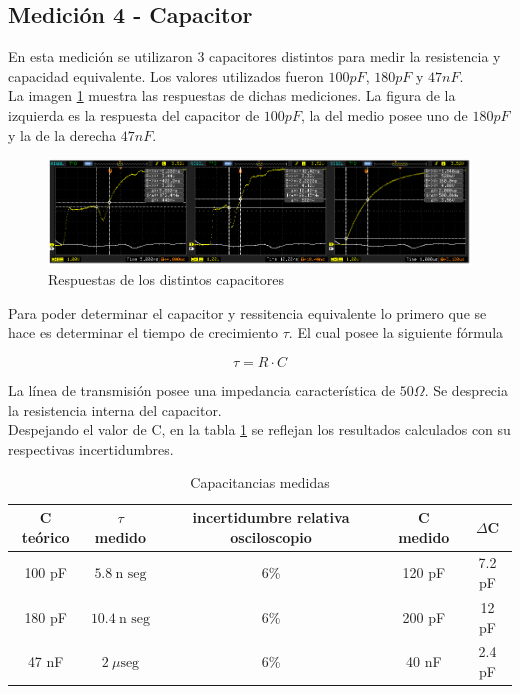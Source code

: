 \documentclass[a4paper,10pt]{article}
\begin{document}
	\subsection{Medición 4 - Capacitor}
	\indent En esta medición se utilizaron 3 capacitores distintos para medir
	la resistencia y capacidad equivalente. Los valores utilizados fueron 
	$100pF$, $180pF$ y $47nF$. \\
	\indent La imagen \ref{img010} muestra las respuestas de dichas 
	mediciones. La figura de la izquierda es la respuesta del capacitor de 
	$100pF$, la del medio posee uno de $180pF$ y la de la derecha $47nF$. \\
	
		\begin{figure}[!htb]
			\centering
			\includegraphics[width=12cm]
			{Imagenes/CurvasCapacitor.png}
			\caption{Respuestas de los distintos capacitores}
			\label{img010} 
		\end{figure}

	\indent Para poder determinar el capacitor y ressitencia equivalente lo 
	primero que se hace es determinar el tiempo de crecimiento $\tau$. El cual
	posee la siguiente fórmula

		\begin{equation}
			\tau = R\cdot C
		\end{equation}
	
	\indent La línea de transmisión posee una impedancia característica de 
	$50\Omega$. Se desprecia la resistencia interna del capacitor. \\
	\indent Despejando el valor de C, en la tabla \ref{tab002} se reflejan los 
	resultados calculados con su respectivas incertidumbres. \\

		\begin{table}[!htp]
			\centering
			\begin{tabular}{|c|c|c|c|c|}
				\hline
    			C teórico & $\tau$ medido & incertidumbre relativa osciloscopio 
				& C medido & $\Delta$C \\
				\hline
				100 pF & $5.8~\text{n seg}$ & 6\% & 120 pF & 7.2 pF \\
				\hline 
				180 pF & $10.4~\text{n seg}$ & 6\% & 200 pF & 12 pF \\
				\hline
				47 nF & $2~\mu\text{seg}$ & 6\% & 40 nF & 2.4 pF \\
				\hline
			\end{tabular}
			\caption{Capacitancias medidas} 
			\label{tab002} 
		\end{table}
\end{document}
